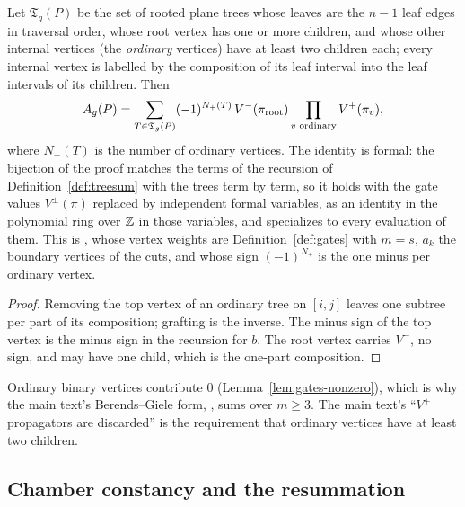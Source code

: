 \begin{lemma}\label{lem:treesum-trees}
Let $\mathfrak T_g(P)$ be the set of rooted plane trees whose leaves are the
$n-1$ leaf edges in traversal order, whose root vertex has one or more
children, and whose other internal vertices (the \emph{ordinary} vertices)
have at least two children each; every internal vertex is labelled by the
composition of its leaf interval into the leaf intervals of its children.
Then
\[
A_g(P)=\sum_{T\in\mathfrak T_g(P)}(-1)^{N_+(T)}\,
V^-(\pi_{\rm root})\prod_{v\text{ ordinary}}V^+(\pi_v),
\]
where $N_+(T)$ is the number of ordinary vertices. The identity is formal:
the bijection of the proof matches the terms of the recursion of
Definition~\ref{def:treesum} with the trees term by term, so it holds with
the gate values $V^\pm(\pi)$ replaced by independent formal variables, as an
identity in the polynomial ring over $\mathbb Z$ in those variables, and
specializes to every evaluation of them. This is ,
whose vertex weights are Definition~\ref{def:gates} with
$m=s$, $a_k$ the boundary vertices of the cuts, and whose sign
$(-1)^{N_+}$ is the one minus per ordinary vertex. 
\end{lemma}
\begin{proof}
Removing the top vertex of an ordinary tree on $[i,j]$ leaves one subtree per
part of its composition; grafting is the inverse. The minus sign of the top
vertex is the minus sign in the recursion for $b$. The root vertex carries
$V^-$, no sign, and may have one child, which is the one-part composition.
\end{proof}

\begin{remark}
Ordinary binary vertices contribute $0$ (Lemma~\ref{lem:gates-nonzero}),
which is why the main text's Berends--Giele form, , sums over $m\geq3$.
The main text's ``$V^+$ propagators are discarded'' is the requirement that
ordinary vertices have at least two children.
\end{remark}

\subsection{Chamber constancy and the resummation}

